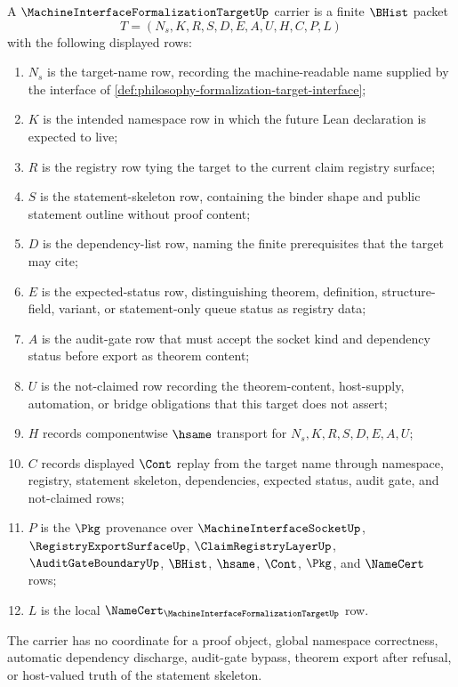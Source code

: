 \begin{definition}
\label{def:machine-interface-formalization-target-carrier}
A $\MachineInterfaceFormalizationTargetUp$ carrier is a finite $\BHist$ packet
$$
T=(N_s,K,R,S,D,E,A,U,H,C,P,L)
$$
with the following displayed rows:
\begin{enumerate}
\item $N_s$ is the target-name row, recording the machine-readable name supplied by the interface of \autoref{def:philosophy-formalization-target-interface};
\item $K$ is the intended namespace row in which the future Lean declaration is expected to live;
\item $R$ is the registry row tying the target to the current claim registry surface;
\item $S$ is the statement-skeleton row, containing the binder shape and public statement outline without proof content;
\item $D$ is the dependency-list row, naming the finite prerequisites that the target may cite;
\item $E$ is the expected-status row, distinguishing theorem, definition, structure-field, variant, or statement-only queue status as registry data;
\item $A$ is the audit-gate row that must accept the socket kind and dependency status before export as theorem content;
\item $U$ is the not-claimed row recording the theorem-content, host-supply, automation, or bridge obligations that this target does not assert;
\item $H$ records componentwise $\hsame$ transport for $N_s,K,R,S,D,E,A,U$;
\item $C$ records displayed $\Cont$ replay from the target name through namespace, registry, statement skeleton, dependencies, expected status, audit gate, and not-claimed rows;
\item $P$ is the $\Pkg$ provenance over $\MachineInterfaceSocketUp$, $\RegistryExportSurfaceUp$, $\ClaimRegistryLayerUp$, $\AuditGateBoundaryUp$, $\BHist$, $\hsame$, $\Cont$, $\Pkg$, and $\NameCert$ rows;
\item $L$ is the local $\NameCert_{\MachineInterfaceFormalizationTargetUp}$ row.
\end{enumerate}
The carrier has no coordinate for a proof object, global namespace correctness, automatic dependency discharge, audit-gate bypass, theorem export after refusal, or host-valued truth of the statement skeleton.
\end{definition}

